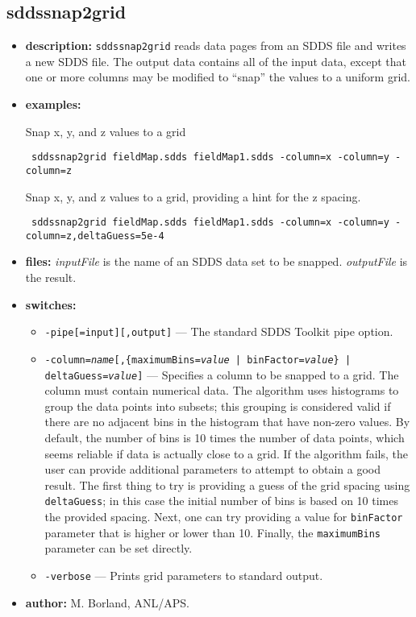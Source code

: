 \newpage
\subsection{sddssnap2grid}
\label{sddssnap2grid}

\begin{itemize}
\item {\bf description:}
\verb|sddssnap2grid| reads data pages from an SDDS file and writes a new SDDS file.
The output data contains all of the input data, except that one or more columns may be
modified to ``snap'' the values to a uniform grid.
\item {\bf examples:} 

Snap x, y, and z values to a grid
\begin{flushleft}{\tt
sddssnap2grid fieldMap.sdds fieldMap1.sdds -column=x -column=y -column=z
}\end{flushleft}

Snap x, y, and z values to a grid, providing a hint for the z spacing.
\begin{flushleft}{\tt
sddssnap2grid fieldMap.sdds fieldMap1.sdds -column=x -column=y -column=z,deltaGuess=5e-4
}\end{flushleft}

\item {\bf files:}
{\em inputFile} is the name of an SDDS data set to be snapped.  {\em outputFile} is the result. 

\item {\bf switches:} 
\begin{itemize}
        \item {\tt -pipe[=input][,output]} --- The standard SDDS Toolkit pipe option.
        \item {\tt -column={\em name}[,\{maximumBins={\em value} | binFactor={\em value}\} | deltaGuess={\em value}]} 
          --- Specifies a column to be snapped to a grid. The column must contain 
          numerical data. 
          The algorithm uses histograms to group the data points into subsets; this grouping is considered valid
          if there are no adjacent bins in the histogram that have non-zero values.
          By default, the number of bins is 10 times the number of data points, which seems reliable if data
          is actually close to a grid.
          If the algorithm fails, the user can provide additional parameters to attempt to obtain a good result.
          The first thing to try is providing a guess of the grid spacing using {\tt deltaGuess}; in this
          case the initial number of bins is based on 10 times the provided spacing.
          Next, one can try providing a value for {\tt binFactor} parameter that is higher or lower than 10.
          Finally, the {\tt maximumBins} parameter can be set directly.
          \item {\tt -verbose} --- Prints grid parameters to standard output.
\end{itemize}

\item {\bf author:} M. Borland, ANL/APS.
\end{itemize}



